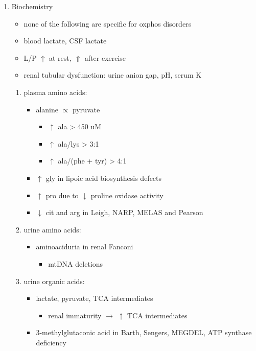 \documentclass{scrartcl}
\begin{document}
\begin{enumerate}
\item Biochemistry
\label{sec:org4624aaf}
\begin{itemize}
\item none of the following are specific for oxphos disorders
\item blood lactate, CSF lactate
\item L/P \(\uparrow\) at rest, \(\Uparrow\) after exercise
\item renal tubular dysfunction: urine anion gap, pH, serum K
\end{itemize}
\begin{enumerate}
\item plasma amino acids:
\label{sec:orgde6ccf6}
\begin{itemize}
\item alanine \(\propto\) pyruvate
\begin{itemize}
\item \(\uparrow\) ala \textgreater{} 450 uM
\item \(\uparrow\) ala/lys \textgreater{} 3:1
\item \(\uparrow\) ala/(phe + tyr) \textgreater{} 4:1
\end{itemize}
\item \(\uparrow\) gly in lipoic acid biosynthesis defects
\item \(\uparrow\) pro due to \(\downarrow\) proline oxidase activity
\item \(\downarrow\) cit and arg in Leigh, NARP, MELAS and Pearson
\end{itemize}
\item urine amino acids:
\label{sec:org0810631}
\begin{itemize}
\item aminoaciduria in renal Fanconi
\begin{itemize}
\item mtDNA deletions
\end{itemize}
\end{itemize}
\item urine organic acids:
\label{sec:org0579f79}
\begin{itemize}
\item lactate, pyruvate, TCA intermediates
\begin{itemize}
\item renal immaturity \(\to\) \(\uparrow\) TCA intermediates
\end{itemize}
\item 3-methylglutaconic acid in Barth, Sengers, MEGDEL, ATP synthase deficiency

\end{itemize}
\end{enumerate}
\end{enumerate}
\end{document}
